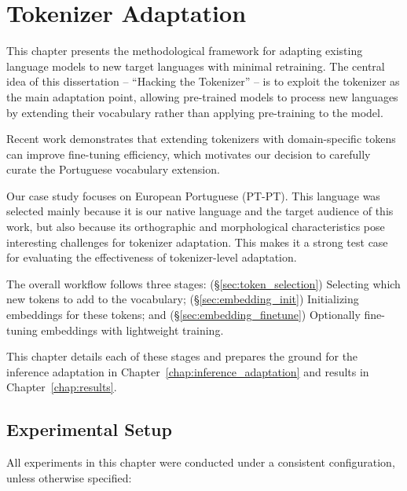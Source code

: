
\chapter{Tokenizer Adaptation}


\label{chap:tokenizer_adaptation}

This chapter presents the methodological framework for adapting existing language models to new target languages with minimal retraining. The central idea of this dissertation -- ``Hacking the Tokenizer'' -- is to exploit the tokenizer as the main adaptation point, allowing pre-trained models to process new languages by extending their vocabulary rather than applying pre-training to the model. 

Recent work \cite{김재윤2025exploring} demonstrates that extending tokenizers with domain-specific tokens can improve fine-tuning efficiency, which motivates our decision to carefully curate the Portuguese vocabulary extension.

Our case study focuses on European Portuguese (PT-PT). This language was selected mainly because it is our native language and the target audience of this work, but also because its orthographic and morphological characteristics pose interesting challenges for tokenizer adaptation. This makes it a strong test case for evaluating the effectiveness of tokenizer-level adaptation.

The overall workflow follows three stages: (\S\ref{sec:token_selection}) Selecting which new tokens to add to the vocabulary; (\S\ref{sec:embedding_init}) Initializing embeddings for these tokens; and (\S\ref{sec:embedding_finetune}) Optionally fine-tuning embeddings with lightweight training.

This chapter details each of these stages and prepares the ground for the inference adaptation in Chapter~\ref{chap:inference_adaptation} and results in Chapter~\ref{chap:results}.


\section{Experimental Setup}
\label{sec:exp_setup}

All experiments in this chapter were conducted under a consistent configuration, unless otherwise specified:

